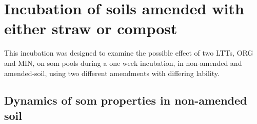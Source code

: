 








\section{Incubation of soils amended with either straw or compost}
    This incubation was designed to examine the possible effect of two LTTs, ORG and MIN, on \gls{som} pools during a one week incubation, in non-amended and amended-soil, using two different amendments with differing lability.

    \subsection{Dynamics of \gls{som} properties in non-amended soil}

